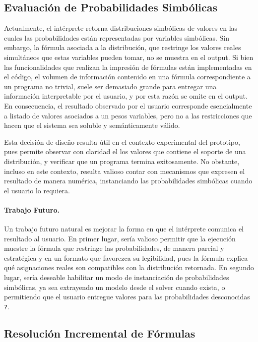 \subsection{Evaluación de Probabilidades Simbólicas}\label{subsec:lim-prob-simbolicas}

Actualmente, el intérprete retorna distribuciones simbólicas de
valores en las cuales las probabilidades están representadas por
variables simbólicas. Sin embargo, la fórmula asociada a la
distribución, que restringe los valores reales simultáneos que estas
variables pueden tomar, no se muestra en el output.  Si bien las
funcionalidades que realizan la impresión de fórmulas están
implementadas en el código, el volumen de información contenido en una
fórmula correspondiente a un programa no trivial, suele ser demasiado
grande para entregar una información interpretable por el usuario, y
por esta razón se omite en el output.  En consecuencia, el resultado
observado por el usuario corresponde esencialmente a listado de
valores asociados a un pesos variables, pero no a las restricciones
que hacen que el sistema sea soluble y semánticamente válido.

Esta decisión de diseño resulta útil en el contexto experimental del
prototipo, pues permite observar con claridad el los valores que
contiene el soporte de una distribución, y verificar que un programa
termina exitosamente. No obstante, incluso en este contexto, resulta
valioso contar con mecanismos que expresen el resultado de manera
numérica, instanciando las probabilidades simbólicas cuando el usuario
lo requiera.

 \paragraph{Trabajo Futuro.}
 Un trabajo futuro natural es mejorar la forma en que el intérprete
 comunica el resultado al usuario. En primer lugar, sería valioso
 permitir que la ejecución muestre la fórmula que restringe las
 probabilidades, de manera parcial y estratégica y en un formato que
 favorezca su legibilidad, pues la fórmula explica qué asignaciones
 reales son compatibles con la distribución retornada.  En segundo
 lugar, sería deseable habilitar un modo de instanciación de
 probabilidades simbólicas, ya sea extrayendo un modelo desde el
 solver cuando exista, o permitiendo que el usuario entregue valores
 para las probabilidades desconocidas \lstinline|?|.

\subsection{Resolución Incremental de Fórmulas}\label{subsec:lim-incremental}

